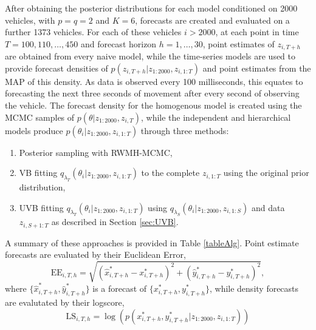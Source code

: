 \documentclass[12pt,a4paper]{article}\usepackage[]{graphicx}\usepackage[]{color}
\begin{document}
After obtaining the posterior distributions for each model conditioned on 2000 vehicles, with $p = q = 2$ and $K = 6$, forecasts are created and evaluated on a further 1373 vehicles. For each of these vehicles $i > 2000$, at each point in time $T = 100, 110, \dots, 450$ and forecast horizon $h = 1, \dots, 30$, point estimates of $z_{i, T+h}$ are obtained from every naive model, while the time-series models are used to provide forecast densities of $p(z_{i, T+h} | z_{1:2000}, z_{i, 1:T})$ and point estimates from the MAP of this density. As data is observed every 100 milliseconds, this equates to forecasting the next three seconds of movement after every second of observing the vehicle. The forecast density for the homogenous model is created using the MCMC samples of $p(\theta | z_{1:2000}, z_{i, T})$, while the independent and hierarchical models produce $p(\theta_{i} | z_{1:2000}, z_{i, 1:T})$ through three methods:
\begin{enumerate}
\item Posterior sampling with RWMH-MCMC,
\item VB fitting $q_{\lambda_T}(\theta_{i} | z_{1:2000}, z_{i, 1:T})$ to the complete $z_{i, 1:T}$ using the original prior distribution,
\item UVB fitting $q_{\lambda_T}(\theta_{i} | z_{1:2000}, z_{i, 1:T})$ using $q_{\lambda_S}(\theta_{i} | z_{1:2000}, z_{i, 1:S})$ and data $z_{i, S+1:T}$ as described in Section \ref{sec:UVB}.
\end{enumerate}
A summary of these approaches is provided in Table \ref{tableAlg}. Point estimate forecasts are evaluated by their Euclidean Error,
\begin{equation}
\mbox{EE}_{i, T, h} = \sqrt{\left(\hat{x}^*_{i, T+h} - x^*_{i, T+h} \right)^2 + \left(\hat{y}^*_{i, T+h} - y^*_{i, T+h} \right)^2},
\label{eucError}
\end{equation}
where $\{\hat{x}^*_{i, T+h}, \hat{y}^*_{i, T+h}\}$ is a forecast of $\{x^*_{i, T+h}, y^*_{i, T+h}\}$, while density forecasts are evalutated by their logscore,
\begin{equation}
\mbox{LS}_{i, T, h} = \log \left(p\left(x^*_{i, T+h}, y^*_{i, T+h} | z_{1:2000}, z_{i, 1:T} \right) \right)
\label{logscore}
\end{equation}
\end{document}
